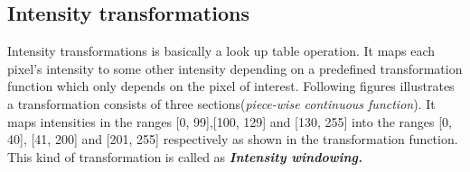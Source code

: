 \documentclass[a4paper,10pt]{article}%
\begin{document}
\subsection{Intensity transformations}
Intensity transformations is basically a look up table operation. It maps each pixel's intensity to some other intensity depending on a predefined transformation function which only depends on the pixel of interest. Following figures illustrates a transformation consists of three sections(\textit{piece-wise continuous function}). It maps intensities in the ranges [0, 99],[100, 129] and [130, 255] into the ranges [0, 40], [41, 200] and [201, 255] respectively as shown in the transformation function. This kind of transformation is called as \textbf{\textit{Intensity windowing.}}

\begin{figure}[!h]
	\centering
\end{figure}
\end{document}
